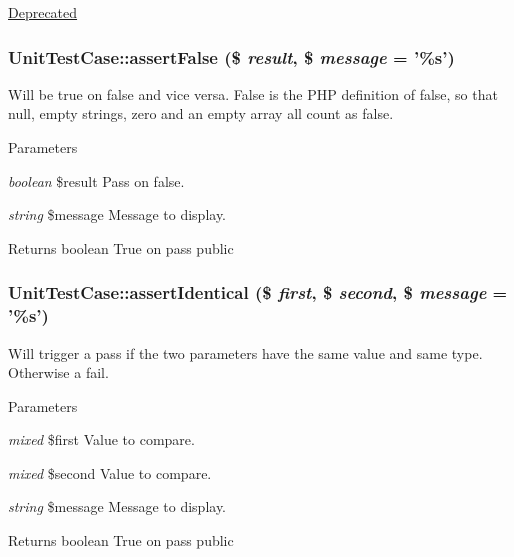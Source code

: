 \label{class_unit_test_case_a145f3c7e61fd66e2e2d4a6bb87f58ea0}
\begin{Desc}
\item[\hyperlink{deprecated__deprecated000023}{Deprecated}]\end{Desc}
\hypertarget{class_unit_test_case_a05b9da85b91d042555b87708b33cbeb2}{
\subsubsection[{assertFalse}]{\setlength{\rightskip}{0pt plus 5cm}UnitTestCase::assertFalse (\$ {\em result}, \/  \$ {\em message} = {\ttfamily '\%s'})}}
\label{class_unit_test_case_a05b9da85b91d042555b87708b33cbeb2}
Will be true on false and vice versa. False is the PHP definition of false, so that null, empty strings, zero and an empty array all count as false. 
\begin{DoxyParams}{Parameters}
\item[{\em boolean}]\$result Pass on false. \item[{\em string}]\$message Message to display. \end{DoxyParams}
\begin{DoxyReturn}{Returns}
boolean True on pass  public 
\end{DoxyReturn}
\hypertarget{class_unit_test_case_ac44a3356c9546370e31cd5e71123c5bd}{
\subsubsection[{assertIdentical}]{\setlength{\rightskip}{0pt plus 5cm}UnitTestCase::assertIdentical (\$ {\em first}, \/  \$ {\em second}, \/  \$ {\em message} = {\ttfamily '\%s'})}}
\label{class_unit_test_case_ac44a3356c9546370e31cd5e71123c5bd}
Will trigger a pass if the two parameters have the same value and same type. Otherwise a fail. 
\begin{DoxyParams}{Parameters}
\item[{\em mixed}]\$first Value to compare. \item[{\em mixed}]\$second Value to compare. \item[{\em string}]\$message Message to display. \end{DoxyParams}
\begin{DoxyReturn}{Returns}
boolean True on pass  public 
\end{DoxyReturn}
